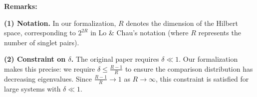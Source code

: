 \bigskip

\noindent\textbf{Remarks:}

\noindent\textbf{(1) Notation.} In our formalization, $R$ denotes the dimension of the Hilbert space, corresponding to $2^{2R}$ in Lo \& Chau's notation (where $R$ represents the number of singlet pairs).

\medskip

\noindent\textbf{(2) Constraint on $\delta$.} The original paper requires $\delta \ll 1$. Our formalization makes this precise: we require $\delta \leq \frac{R-1}{R}$ to ensure the comparison distribution has decreasing eigenvalues. Since $\frac{R-1}{R} \to 1$ as $R \to \infty$, this constraint is satisfied for large systems with $\delta \ll 1$.


